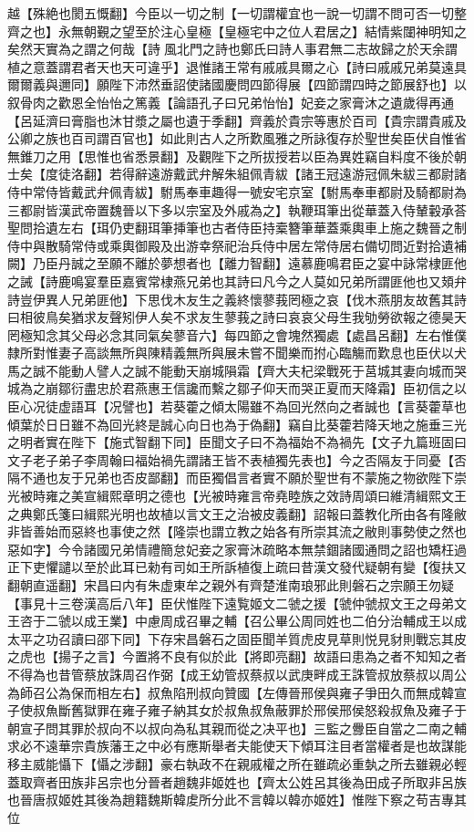 越【殊絶也閡五慨翻】今臣以一切之制【一切謂權宜也一說一切謂不問可否一切整齊之也】永無朝覲之望至於注心皇極【皇極宅中之位人君居之】結情紫闥神明知之矣然天實為之謂之何哉【詩風北門之詩也鄭氏曰詩人事君無二志故歸之於天余謂植之意蓋謂君者天也天可違乎】退惟諸王常有戚戚具爾之心【詩曰戚戚兄弟莫遠具爾爾義與邇同】願陛下沛然垂詔使諸國慶問四節得展【四節謂四時之節展舒也】以叙骨肉之歡恩全怡怡之篤義【論語孔子曰兄弟怡怡】妃妾之家膏沐之遺歲得再通【呂延濟曰膏脂也沐甘漿之屬也遺于季翻】齊義於貴宗等惠於百司【貴宗謂貴戚及公卿之族也百司謂百官也】如此則古人之所歎風雅之所詠復存於聖世矣臣伏自惟省無錐刀之用【思惟也省悉景翻】及觀陛下之所拔授若以臣為異姓竊自料度不後於朝士矣【度徒洛翻】若得辭遠游戴武弁解朱組佩青紱【諸王冠遠游冠佩朱紱三都尉諸侍中常侍皆戴武弁佩青紱】駙馬奉車趣得一號安宅京室【駙馬奉車都尉及騎都尉為三都尉皆漢武帝置魏晉以下多以宗室及外戚為之】執鞭珥筆出從華蓋入侍輦轂承荅聖問拾遺左右【珥仍吏翻珥筆挿筆也古者侍臣持槖簪筆華蓋乘輿車上施之魏晉之制侍中與散騎常侍或乘輿御殿及出游幸祭祀治兵侍中居左常侍居右備切問近對拾遺補闕】乃臣丹誠之至願不離於夢想者也【離力智翻】遠慕鹿鳴君臣之宴中詠常棣匪他之誡【詩鹿鳴宴羣臣嘉賓常棣燕兄弟也其詩曰凡今之人莫如兄弟所謂匪他也又頍弁詩豈伊異人兄弟匪他】下思伐木友生之義終懷蓼莪罔極之哀【伐木燕朋友故舊其詩曰相彼鳥矣猶求友聲矧伊人矣不求友生蓼莪之詩曰哀哀父母生我劬勞欲報之德昊天罔極知念其父母必念其同氣矣蓼音六】每四節之會塊然獨處【處昌呂翻】左右惟僕隸所對惟妻子高談無所與陳精義無所與展未嘗不聞樂而拊心臨觴而歎息也臣伏以犬馬之誠不能動人譬人之誠不能動天崩城隕霜【齊大夫杞梁戰死于莒城其妻向城而哭城為之崩鄒衍盡忠於君燕惠王信讒而繫之鄒子仰天而哭正夏而天降霜】臣初信之以臣心况徒虚語耳【况譬也】若葵藿之傾太陽雖不為回光然向之者誠也【言葵藿草也傾葉於日日雖不為回光終是誠心向日也為于偽翻】竊自比葵藿若降天地之施垂三光之明者實在陛下【施式智翻下同】臣聞文子曰不為福始不為禍先【文子九篇班固曰文子老子弟子李周翰曰福始禍先謂諸王皆不表植獨先表也】今之否隔友于同憂【否隔不通也友于兄弟也否皮鄙翻】而臣獨倡言者實不願於聖世有不蒙施之物欲陛下崇光被時雍之美宣緝熙章明之德也【光被時雍言帝堯睦族之效詩周頌曰維清緝熙文王之典鄭氏箋曰緝熙光明也故植以言文王之治被皮義翻】詔報曰蓋教化所由各有隆敝非皆善始而惡終也事使之然【隆崇也謂立教之始各有所崇其流之敝則事勢使之然也惡如字】今令諸國兄弟情禮簡怠妃妾之家膏沐疏略本無禁錮諸國通問之詔也矯枉過正下吏懼譴以至於此耳已勑有司如王所訴植復上疏曰昔漢文發代疑朝有變【復扶又翻朝直遥翻】宋昌曰内有朱虚東牟之親外有齊楚淮南琅邪此則磐石之宗願王勿疑【事見十三卷漢高后八年】臣伏惟陛下遠覧姬文二虢之援【虢仲虢叔文王之母弟文王咨于二虢以成王業】中慮周成召畢之輔【召公畢公周同姓也二伯分治輔成王以成太平之功召讀曰邵下同】下存宋昌磐石之固臣聞羊質虎皮見草則悦見豺則戰忘其皮之虎也【揚子之言】今置將不良有似於此【將即亮翻】故語曰患為之者不知知之者不得為也昔管蔡放誅周召作弼【成王幼管叔蔡叔以武庚畔成王誅管叔放蔡叔以周公為師召公為保而相左右】叔魚陷刑叔向贊國【左傳晉邢侯與雍子爭田久而無成韓宣子使叔魚斷舊獄罪在雍子雍子納其女於叔魚叔魚蔽罪於邢侯邢侯怒殺叔魚及雍子于朝宣子問其罪於叔向不以叔向為私其親而從之决平也】三監之釁臣自當之二南之輔求必不遠華宗貴族藩王之中必有應斯舉者夫能使天下傾耳注目者當權者是也故謀能移主威能懾下【懾之涉翻】豪右執政不在親戚權之所在雖疏必重埶之所去雖親必輕蓋取齊者田族非呂宗也分晉者趙魏非姬姓也【齊太公姓呂其後為田成子所取非呂族也晉唐叔姬姓其後為趙籍魏斯韓䖍所分此不言韓以韓亦姬姓】惟陛下察之苟吉專其位